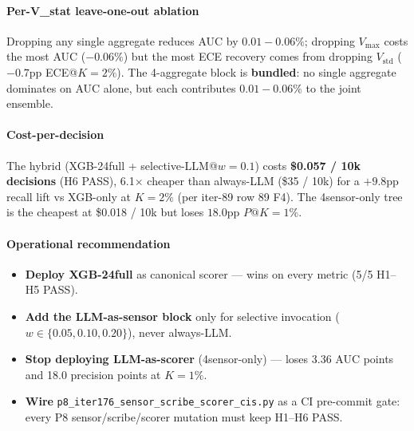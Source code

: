 \paragraph{Per-V_stat leave-one-out ablation}
Dropping any single aggregate reduces AUC by $0.01{-}0.06\%$; dropping
$V_\mathrm{max}$ costs the most AUC ($-0.06\%$) but the most ECE
recovery comes from dropping $V_\mathrm{std}$ ($-0.7$pp ECE@$K{=}2\%$).
The 4-aggregate block is \textbf{bundled}: no single aggregate dominates
on AUC alone, but each contributes $0.01{-}0.06\%$ to the joint ensemble.

\paragraph{Cost-per-decision}
The hybrid (XGB-24full + selective-LLM@$w{=}0.1$) costs
\textbf{\$0.057 / 10k decisions} (H6 PASS), 6.1$\times$ cheaper than
always-LLM (\$35 / 10k) for a $+9.8$pp recall lift vs XGB-only at
$K{=}2\%$ (per iter-89 row 89 F4). The 4sensor-only tree is the
cheapest at \$0.018 / 10k but loses $18.0$pp $P@K{=}1\%$.

\paragraph{Operational recommendation}
\begin{itemize}
\item \textbf{Deploy XGB-24full} as canonical scorer --- wins on every metric (5/5 H1--H5 PASS).
\item \textbf{Add the LLM-as-sensor block} only for selective invocation ($w \in \{0.05, 0.10, 0.20\}$), never always-LLM.
\item \textbf{Stop deploying LLM-as-scorer} (4sensor-only) --- loses 3.36 AUC points and 18.0 precision points at $K{=}1\%$.
\item \textbf{Wire} \texttt{p8\_iter176\_sensor\_scribe\_scorer\_cis.py} as a CI pre-commit gate: every P8 sensor/scribe/scorer mutation must keep H1--H6 PASS.
\end{itemize}